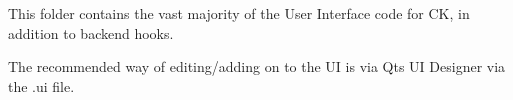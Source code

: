 This folder contains the vast majority of the User Interface code for CK, in addition to backend hooks.

The recommended way of editing/adding on to the UI is via Qt\textquotesingle{}s UI Designer via the .ui file. 
